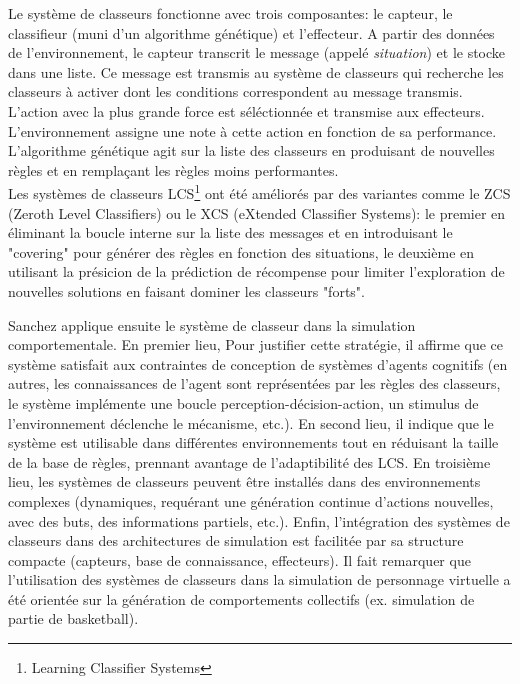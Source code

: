 \documentclass[11pt]{article}
\begin{document}
Le système de classeurs fonctionne avec trois composantes: le capteur, le classifieur (muni d'un algorithme génétique) et l'effecteur. A partir des données de l'environnement, le capteur transcrit le message (appelé \textit{situation}) et le stocke dans une liste. Ce message est transmis au système de classeurs qui recherche les classeurs à activer dont les conditions correspondent au message transmis. L'action avec la plus grande force est séléctionnée et transmise aux effecteurs. L'environnement assigne une note à cette action en fonction de sa performance. L'algorithme génétique agit sur la liste des classeurs en produisant de nouvelles règles et en remplaçant les règles moins performantes.\\
Les systèmes de classeurs LCS\footnote{Learning Classifier Systems} ont été améliorés par des variantes comme le ZCS (Zeroth Level Classifiers) ou le XCS (eXtended Classifier Systems): le premier en éliminant la boucle interne sur la liste des messages et en introduisant le "covering" pour générer des règles en fonction des situations, le deuxième en utilisant la présicion de la prédiction de récompense pour limiter l'exploration de nouvelles solutions en faisant dominer les classeurs "forts". 

Sanchez applique ensuite le système de classeur dans la simulation comportementale. En premier lieu, Pour justifier cette stratégie, il affirme que ce système satisfait aux contraintes de conception de systèmes d'agents cognitifs (en autres, les connaissances de l'agent sont représentées par les règles des classeurs, le système implémente une boucle perception-décision-action, un stimulus de l'environnement déclenche le mécanisme, etc.). En second lieu, il indique que le système est utilisable dans différentes environnements tout en réduisant la taille de la base de règles, prennant avantage de l'adaptibilité des LCS. En troisième lieu, les systèmes de classeurs peuvent être installés dans des environnements complexes (dynamiques, requérant une génération continue d'actions nouvelles, avec des buts, des informations partiels, etc.). Enfin, l'intégration des systèmes de classeurs dans des architectures de simulation est facilitée par sa structure compacte (capteurs, base de connaissance, effecteurs). Il fait remarquer que l'utilisation des systèmes de classeurs dans la simulation de personnage virtuelle a été orientée sur la génération de comportements collectifs (ex. simulation de partie de basketball).
\end{document}

